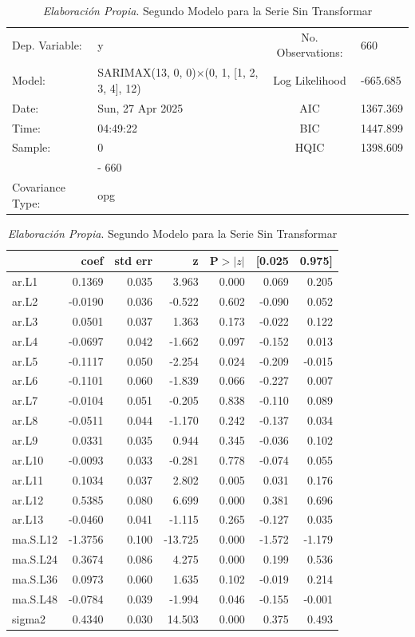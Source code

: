 \documentclass[12pt,letterpaper]{article}   %
\begin{document}
\begin{table}[htbp]
\centering
\tiny
\caption{\textit{Elaboración Propia}. Segundo Modelo para la Serie Sin Transformar}
\begin{tabular}{llcl}
\toprule
Dep. Variable: & y & No. Observations: & 660 \\
Model: & SARIMAX(13, 0, 0)$\times$(0, 1, [1, 2, 3, 4], 12) & Log Likelihood & -665.685 \\
Date: & Sun, 27 Apr 2025 & AIC & 1367.369 \\
Time: & 04:49:22 & BIC & 1447.899 \\
Sample: & 0 & HQIC & 1398.609 \\
        & - 660 & & \\
Covariance Type: & opg & & \\
\bottomrule
\end{tabular}

\vspace{0.3cm}

\begin{tabular}{lrrrrrr}
\toprule
 & \textbf{coef} & \textbf{std err} & \textbf{z} & \textbf{P$>|z|$} & \textbf{[0.025} & \textbf{0.975]} \\
\midrule
ar.L1     & 0.1369 & 0.035 & 3.963  & 0.000 & 0.069 & 0.205 \\
ar.L2     & -0.0190 & 0.036 & -0.522 & 0.602 & -0.090 & 0.052 \\
ar.L3     & 0.0501 & 0.037 & 1.363  & 0.173 & -0.022 & 0.122 \\
ar.L4     & -0.0697 & 0.042 & -1.662 & 0.097 & -0.152 & 0.013 \\
ar.L5     & -0.1117 & 0.050 & -2.254 & 0.024 & -0.209 & -0.015 \\
ar.L6     & -0.1101 & 0.060 & -1.839 & 0.066 & -0.227 & 0.007 \\
ar.L7     & -0.0104 & 0.051 & -0.205 & 0.838 & -0.110 & 0.089 \\
ar.L8     & -0.0511 & 0.044 & -1.170 & 0.242 & -0.137 & 0.034 \\
ar.L9     & 0.0331 & 0.035 & 0.944  & 0.345 & -0.036 & 0.102 \\
ar.L10    & -0.0093 & 0.033 & -0.281 & 0.778 & -0.074 & 0.055 \\
ar.L11    & 0.1034 & 0.037 & 2.802  & 0.005 & 0.031 & 0.176 \\
ar.L12    & 0.5385 & 0.080 & 6.699  & 0.000 & 0.381 & 0.696 \\
ar.L13    & -0.0460 & 0.041 & -1.115 & 0.265 & -0.127 & 0.035 \\
ma.S.L12  & -1.3756 & 0.100 & -13.725 & 0.000 & -1.572 & -1.179 \\
ma.S.L24  & 0.3674 & 0.086 & 4.275  & 0.000 & 0.199 & 0.536 \\
ma.S.L36  & 0.0973 & 0.060 & 1.635  & 0.102 & -0.019 & 0.214 \\
ma.S.L48  & -0.0784 & 0.039 & -1.994 & 0.046 & -0.155 & -0.001 \\
sigma2    & 0.4340 & 0.030 & 14.503 & 0.000 & 0.375 & 0.493 \\
\bottomrule
\end{tabular}


\end{table}
\end{document}

